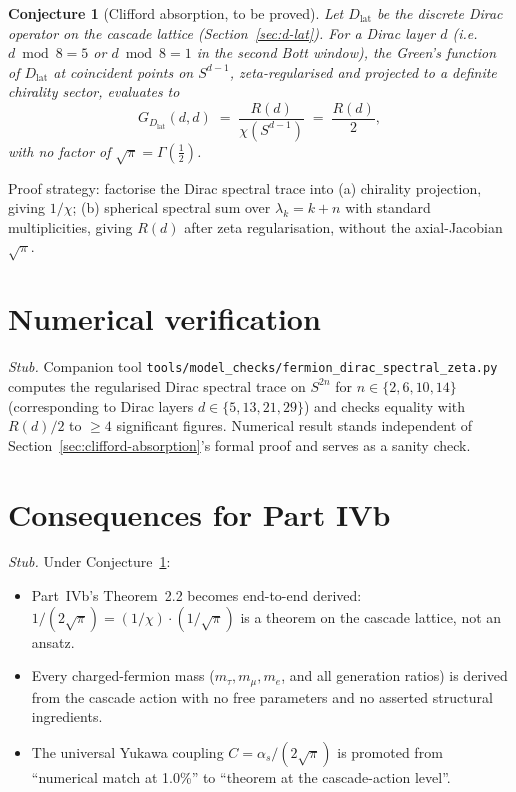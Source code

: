 \documentclass[12pt,a4paper]{article}
\newtheorem{conjecture}[theorem]{Conjecture}
\begin{document}
\begin{conjecture}[Clifford absorption, to be proved]\label{conj:clifford-absorption}
Let $D_{\mathrm{lat}}$ be the discrete Dirac operator on the cascade
lattice (Section~\ref{sec:d-lat}). For a Dirac layer $d$ (i.e.\
$d\bmod 8 = 5$ or $d\bmod 8 = 1$ in the second Bott window), the
Green's function of $D_{\mathrm{lat}}$ at coincident points on
$S^{d-1}$, zeta-regularised and projected to a definite chirality
sector, evaluates to
\[
G_{D_{\mathrm{lat}}}(d,d) \;=\; \frac{R(d)}{\chi(S^{d-1})}
\;=\; \frac{R(d)}{2},
\]
with no factor of $\sqrt{\pi} = \Gamma(\tfrac{1}{2})$.
\end{conjecture}

Proof strategy: factorise the Dirac spectral trace into (a) chirality
projection, giving $1/\chi$; (b) spherical spectral sum over
$\lambda_k = k+n$ with standard multiplicities, giving $R(d)$ after
zeta regularisation, without the axial-Jacobian $\sqrt{\pi}$.

\section{Numerical verification}\label{sec:numerical-verification}
\emph{Stub.} Companion tool
\texttt{tools/model\_checks/fermion\_dirac\_spectral\_zeta.py} computes the
regularised Dirac spectral trace on $S^{2n}$ for
$n\in\{2,6,10,14\}$ (corresponding to Dirac layers
$d\in\{5,13,21,29\}$) and checks equality with $R(d)/2$ to $\geq 4$
significant figures. Numerical result stands independent of
Section~\ref{sec:clifford-absorption}'s formal proof and serves as a
sanity check.

\section{Consequences for Part IVb}\label{sec:consequences}
\emph{Stub.} Under Conjecture~\ref{conj:clifford-absorption}:
\begin{itemize}
\item Part~IVb's Theorem~2.2 becomes end-to-end derived:
$1/(2\sqrt{\pi}) = (1/\chi)\cdot(1/\sqrt{\pi})$ is a theorem on the
cascade lattice, not an ansatz.
\item Every charged-fermion mass
($m_\tau, m_\mu, m_e$, and all generation ratios) is derived from
the cascade action with no free parameters and no asserted
structural ingredients.
\item The universal Yukawa coupling
$C = \alpha_s/(2\sqrt{\pi})$ is promoted from ``numerical match at
1.0\%'' to ``theorem at the cascade-action level''.
\end{itemize}
\end{document}
